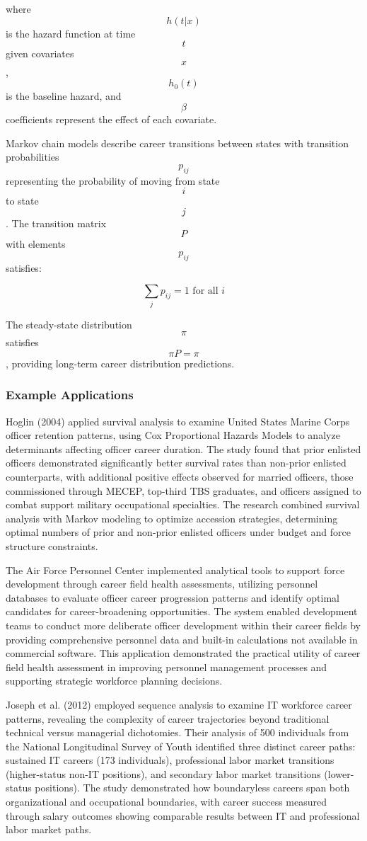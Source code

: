 \documentclass[main.tex]{subfiles}
\begin{document}
where $$h(t|x)$$ is the hazard function at time $$t$$ given covariates $$x$$, $$h_0(t)$$ is the baseline hazard, and $$\beta$$ coefficients represent the effect of each covariate\parencite{hoglin2004}.

Markov chain models describe career transitions between states with transition probabilities $$p_{ij}$$ representing the probability of moving from state $$i$$ to state $$j$$. The transition matrix $$P$$ with elements $$p_{ij}$$ satisfies:

$$\sum_{j} p_{ij} = 1 \text{ for all } i$$

The steady-state distribution $$\pi$$ satisfies $$\pi P = \pi$$, providing long-term career distribution predictions\parencite{otieno2020}.

\subsubsection{Example Applications}

Hoglin (2004) applied survival analysis to examine United States Marine Corps officer retention patterns, using Cox Proportional Hazards Models to analyze determinants affecting officer career duration. The study found that prior enlisted officers demonstrated significantly better survival rates than non-prior enlisted counterparts, with additional positive effects observed for married officers, those commissioned through MECEP, top-third TBS graduates, and officers assigned to combat support military occupational specialties. The research combined survival analysis with Markov modeling to optimize accession strategies, determining optimal numbers of prior and non-prior enlisted officers under budget and force structure constraints\parencite{hoglin2004}.

The Air Force Personnel Center implemented analytical tools to support force development through career field health assessments, utilizing personnel databases to evaluate officer career progression patterns and identify optimal candidates for career-broadening opportunities. The system enabled development teams to conduct more deliberate officer development within their career fields by providing comprehensive personnel data and built-in calculations not available in commercial software. This application demonstrated the practical utility of career field health assessment in improving personnel management processes and supporting strategic workforce planning decisions\parencite{afpc2005}.

Joseph et al. (2012) employed sequence analysis to examine IT workforce career patterns, revealing the complexity of career trajectories beyond traditional technical versus managerial dichotomies. Their analysis of 500 individuals from the National Longitudinal Survey of Youth identified three distinct career paths: sustained IT careers (173 individuals), professional labor market transitions (higher-status non-IT positions), and secondary labor market transitions (lower-status positions). The study demonstrated how boundaryless careers span both organizational and occupational boundaries, with career success measured through salary outcomes showing comparable results between IT and professional labor market paths\parencite{joseph2012}.
\end{document}
